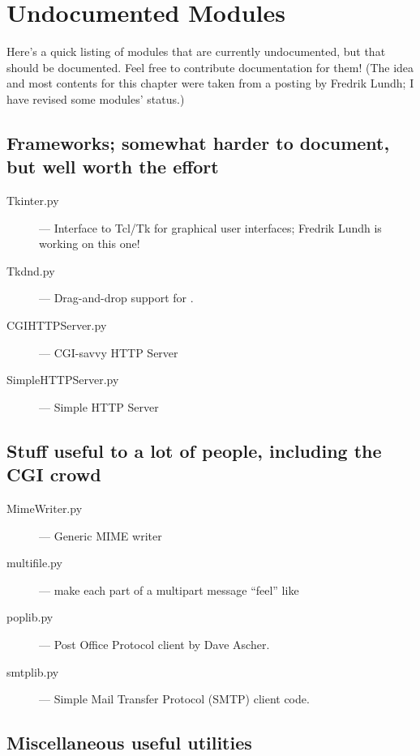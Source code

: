 \chapter{Undocumented Modules}
\label{undoc}

Here's a quick listing of modules that are currently undocumented, but
that should be documented.  Feel free to contribute documentation for
them!  (The idea and most contents for this chapter were taken from a
posting by Fredrik Lundh; I have revised some modules' status.)


\section{Frameworks; somewhat harder to document, but well worth the effort}

\begin{description}
\item[Tkinter.py]
--- Interface to Tcl/Tk for graphical user interfaces;
Fredrik Lundh is working on this one!

\item[Tkdnd.py]
--- Drag-and-drop support for .

\item[CGIHTTPServer.py]
--- CGI-savvy HTTP Server

\item[SimpleHTTPServer.py]
--- Simple HTTP Server
\end{description}


\section{Stuff useful to a lot of people, including the CGI crowd}

\begin{description}
\item[MimeWriter.py]
--- Generic MIME writer

\item[multifile.py]
--- make each part of a multipart message ``feel'' like

\item[poplib.py]
--- Post Office Protocol client by Dave Ascher.

\item[smtplib.py]
--- Simple Mail Transfer Protocol (SMTP) client code.
\end{description}


\section{Miscellaneous useful utilities}

